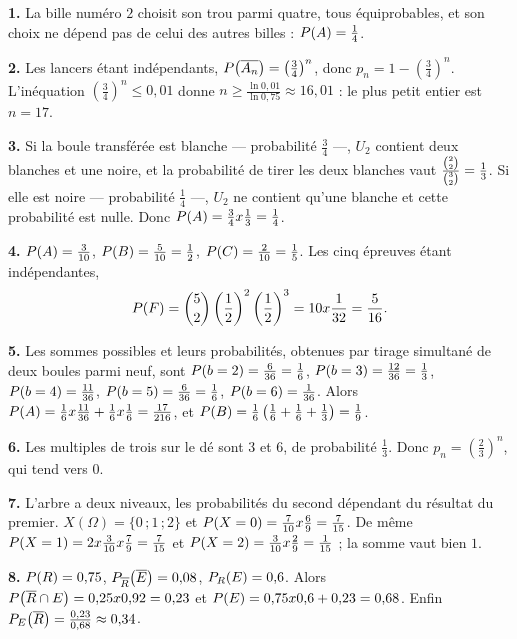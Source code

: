 \begin{corrige}[annales]
\textbf{1.} La bille numéro $2$ choisit son trou parmi quatre, tous
équiprobables, et son choix ne dépend pas de celui des autres billes :
$\proba{A} = \frac14$.

\textbf{2.} Les lancers étant indépendants,
$\proba{\evtc{A_{n}}} = \left(\frac34\right)^{n}$, donc
$p_{n} = 1-\left(\frac34\right)^{n}$. L'inéquation
$\left(\frac34\right)^{n} \leq 0{,}01$ donne
$n \geq \frac{\ln0{,}01}{\ln0{,}75} \approx 16{,}01$ : le plus petit entier
est $n = 17$.

\textbf{3.} Si la boule transférée est blanche — probabilité $\frac34$ —,
$U_{2}$ contient deux blanches et une noire, et la probabilité de tirer les
deux blanches vaut $\frac{\combi{2}{2}}{\combi{2}{3}} = \frac13$. Si elle est
noire — probabilité $\frac14$ —, $U_{2}$ ne contient qu'une blanche et cette
probabilité est nulle. Donc
$\proba{A} = \frac34 \times \frac13 = \frac14$.

\textbf{4.} $\proba{A} = \frac{3}{10}$, $\proba{B} = \frac{5}{10} = \frac12$,
$\proba{C} = \frac{2}{10} = \frac15$. Les cinq épreuves étant indépendantes,
\[
  \proba{F} = \combi{2}{5}\left(\frac12\right)^{2}\left(\frac12\right)^{3}
  = 10 \times \frac{1}{32} = \frac{5}{16}.
\]

\textbf{5.} Les sommes possibles et leurs probabilités, obtenues par tirage
simultané de deux boules parmi neuf, sont
$\proba{b = 2} = \frac{6}{36} = \frac16$,
$\proba{b = 3} = \frac{12}{36} = \frac13$,
$\proba{b = 4} = \frac{11}{36}$,
$\proba{b = 5} = \frac{6}{36} = \frac16$,
$\proba{b = 6} = \frac{1}{36}$. Alors
$\proba{A} = \frac16 \times \frac{11}{36}+\frac16 \times \frac16
= \frac{17}{216}$, et
$\proba{B} = \frac16\left(\frac16+\frac16+\frac13\right) = \frac19$.

\textbf{6.} Les multiples de trois sur le dé sont $3$ et $6$, de probabilité
$\frac13$. Donc $p_{n} = \left(\frac23\right)^{n}$, qui tend vers $0$.

\textbf{7.} L'arbre a deux niveaux, les probabilités du second dépendant du
résultat du premier. $X(\Omega) = \{0\,;1\,;2\}$ et
$\proba{X = 0} = \frac{7}{10} \times \frac69 = \frac{7}{15}$. De même
$\proba{X = 1} = 2 \times \frac{3}{10} \times \frac79 = \frac{7}{15}$ et
$\proba{X = 2} = \frac{3}{10} \times \frac29 = \frac{1}{15}$ ; la somme vaut
bien $1$.

\textbf{8.} $\proba{R} = 0{,}75$, $\probacond{\evtc{E}}{\evtc{R}} = 0{,}08$,
$\probacond{E}{R} = 0{,}6$. Alors
$\proba{\evtc{R} \cap E} = 0{,}25 \times 0{,}92 = 0{,}23$ et
$\proba{E} = 0{,}75 \times 0{,}6+0{,}23 = 0{,}68$. Enfin
$\probacond{\evtc{R}}{E} = \frac{0{,}23}{0{,}68} \approx 0{,}34$.


\end{corrige}
